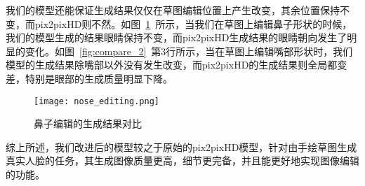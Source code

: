 我们的模型还能保证生成结果仅仅在草图编辑位置上产生改变，其余位置保持不变，而pix2pixHD则不然。如图~\ref{fig:compare_3}~所示，当我们在草图上编辑鼻子形状的时候，我们的模型生成的结果眼睛保持不变，而pix2pixHD生成结果的眼睛朝向发生了明显的变化。如图~\ref{fig:compare_2}~第3行所示，当在草图上编辑嘴部形状时，我们模型的生成结果除嘴部以外没有发生改变，而pix2pixHD的生成结果则全局都变差，特别是眼部的生成质量明显下降。
\begin{figure}[htb]
	\centering
	\texttt{[image: nose\_editing.png]}
	\caption{鼻子编辑的生成结果对比}
	\label{fig:compare_3}
\end{figure}

综上所述，我们改进后的模型较之于原始的pix2pixHD模型，针对由手绘草图生成真实人脸的任务，其生成图像质量更高，细节更完备，并且能更好地实现图像编辑的功能。


